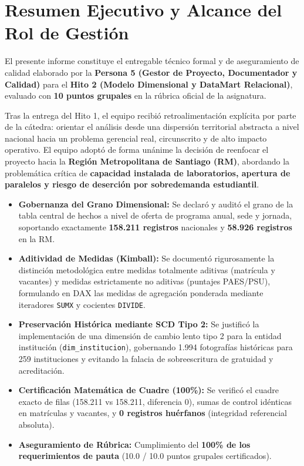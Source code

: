 \documentclass[11pt,a4paper]{article}
\begin{document}
\tableofcontents
\newpage

\section{Resumen Ejecutivo y Alcance del Rol de Gestión}
\label{sec:resumen}

El presente informe constituye el entregable técnico formal y de aseguramiento de calidad elaborado por la \textbf{Persona 5 (Gestor de Proyecto, Documentador y Calidad)} para el \textbf{Hito 2 (Modelo Dimensional y DataMart Relacional)}, evaluado con \textbf{10 puntos grupales} en la rúbrica oficial de la asignatura.

Tras la entrega del Hito 1, el equipo recibió retroalimentación explícita por parte de la cátedra: orientar el análisis desde una dispersión territorial abstracta a nivel nacional hacia un problema gerencial real, circunscrito y de alto impacto operativo. El equipo adoptó de forma unánime la decisión de reenfocar el proyecto hacia la \textbf{Región Metropolitana de Santiago (RM)}, abordando la problemática crítica de \textbf{capacidad instalada de laboratorios, apertura de paralelos y riesgo de deserción por sobredemanda estudiantil}.

\begin{tcolorbox}[colback=white, colframe=accentteal, title=\textbf{Síntesis de Logros y Certificación del Hito 2 (Persona 5)}]
\begin{itemize}[leftmargin=*]
    \item \textbf{Gobernanza del Grano Dimensional:} Se declaró y auditó el grano de la tabla central de hechos a nivel de oferta de programa anual, sede y jornada, soportando exactamente \textbf{158.211 registros} nacionales y \textbf{58.926 registros} en la RM.
    \item \textbf{Aditividad de Medidas (Kimball):} Se documentó rigurosamente la distinción metodológica entre medidas totalmente aditivas (matrícula y vacantes) y medidas estrictamente no aditivas (puntajes PAES/PSU), formulando en DAX las medidas de agregación ponderada mediante iteradores \texttt{SUMX} y cocientes \texttt{DIVIDE}.
    \item \textbf{Preservación Histórica mediante SCD Tipo 2:} Se justificó la implementación de una dimensión de cambio lento tipo 2 para la entidad institución (\texttt{dim\_institucion}), gobernando 1.994 fotografías históricas para 259 instituciones y evitando la falacia de sobreescritura de gratuidad y acreditación.
    \item \textbf{Certificación Matemática de Cuadre (100\%):} Se verificó el cuadre exacto de filas (158.211 vs 158.211, diferencia 0), sumas de control idénticas en matrículas y vacantes, y \textbf{0 registros huérfanos} (integridad referencial absoluta).
    \item \textbf{Aseguramiento de Rúbrica:} Cumplimiento del \textbf{100\% de los requerimientos de pauta} (10.0 / 10.0 puntos grupales certificados).
\end{itemize}
\end{tcolorbox}
\end{document}

